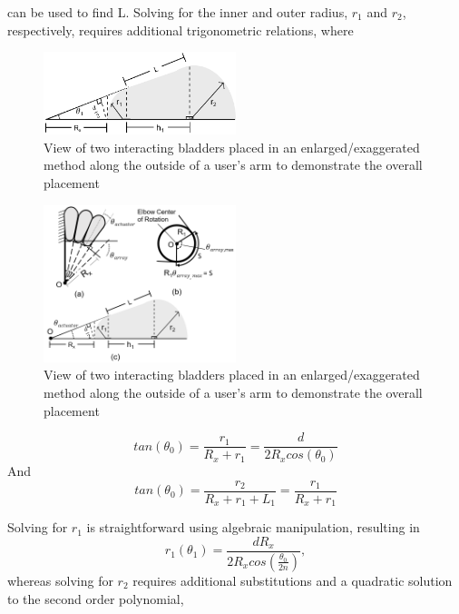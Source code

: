 \documentclass[letterpaper, 10 pt, conference]{ieeeconf}  %
\begin{document}
can be used to find L. Solving for the inner and outer radius, $r_1$ and $r_2$, respectively, requires additional trigonometric relations, where


\begin{figure}[t!]
\centering
\includegraphics[width=0.5\textwidth]{model2.PNG}
\caption{View of two interacting bladders placed in an enlarged/exaggerated method along the outside of a user’s arm to demonstrate the overall placement}
\label{fig:mod1}
\end{figure}

\begin{figure}[t!]
\centering
\includegraphics[width=0.5\textwidth]{model3.PNG}
\caption{View of two interacting bladders placed in an enlarged/exaggerated method along the outside of a user’s arm to demonstrate the overall placement}
\label{fig:mod1}
\end{figure}

\begin{equation}\label{eq. X5}
	tan(\theta_0) = \frac{r_1}{R_x+r_1} = \frac{d}{2R_xcos(\theta_0)}
\end{equation}
And
\begin{equation}\label{eq. X6}
	tan(\theta_0) = \frac{r_2}{R_x+r_1+L_1} = \frac{r_1}{R_x+r_1}
\end{equation}

Solving for $r_1$ is straightforward using algebraic manipulation, resulting in 
\begin{equation}
	r_1(\theta_1)  = \frac{dR_x}{2R_xcos(\frac{\theta_0}{2\textit{n}})},
\end{equation}
whereas solving for $r_2$ requires additional substitutions and a quadratic solution to the second order polynomial,
\end{document}
